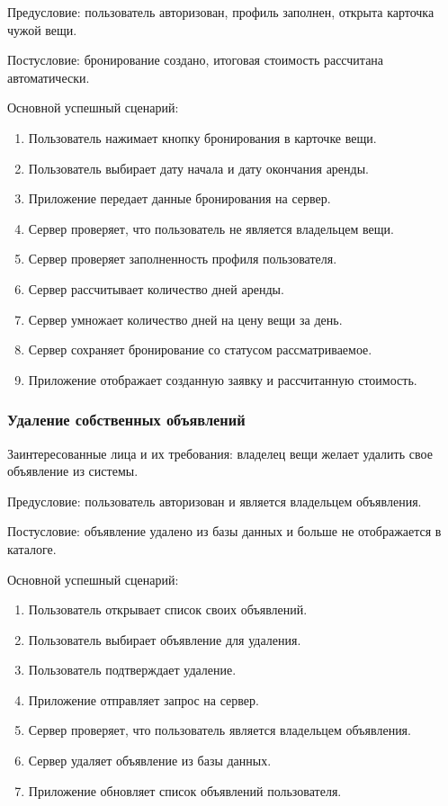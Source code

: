 Предусловие: пользователь авторизован, профиль заполнен, открыта карточка чужой вещи.

Постусловие: бронирование создано, итоговая стоимость рассчитана автоматически.

Основной успешный сценарий:
\begin{enumerate}
    \item Пользователь нажимает кнопку бронирования в карточке вещи.
    \item Пользователь выбирает дату начала и дату окончания аренды.
    \item Приложение передает данные бронирования на сервер.
    \item Сервер проверяет, что пользователь не является владельцем вещи.
    \item Сервер проверяет заполненность профиля пользователя.
    \item Сервер рассчитывает количество дней аренды.
    \item Сервер умножает количество дней на цену вещи за день.
    \item Сервер сохраняет бронирование со статусом рассматриваемое.
    \item Приложение отображает созданную заявку и рассчитанную стоимость.
\end{enumerate}
\subsubsection{Удаление собственных объявлений}
Заинтересованные лица и их требования: владелец вещи желает удалить свое объявление из системы.

Предусловие: пользователь авторизован и является владельцем объявления.

Постусловие: объявление удалено из базы данных и больше не отображается в каталоге.

Основной успешный сценарий:
\begin{enumerate}
    \item Пользователь открывает список своих объявлений.
    \item Пользователь выбирает объявление для удаления.
    \item Пользователь подтверждает удаление.
    \item Приложение отправляет запрос на сервер.
    \item Сервер проверяет, что пользователь является владельцем объявления.
    \item Сервер удаляет объявление из базы данных.
    \item Приложение обновляет список объявлений пользователя.
\end{enumerate}
